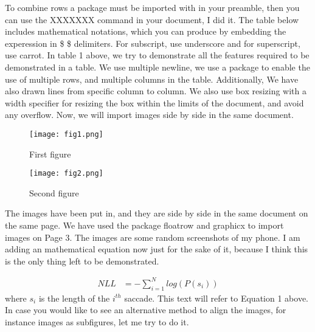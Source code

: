 \documentclass[14pt]{extarticle}
\begin{document}
To combine rows a package must  be  imported with in your preamble, then
you can use the\hspace{0.25cm} XXXXXXX  \hspace{0.3cm} command in your document,  I\hspace{0.3cm}  did\hspace{0.5cm}  it.  \hspace{0.3cm}The \hspace{0.25cm}
table below includes  mathematical  notations, \hspace{0.20cm}which \hspace{0.5cm}you \hspace{0.5cm}can produce by
embedding  the  experession in \hspace{0.25cm}\$ \$\hspace{0.25cm} delimiters. \hspace{0.2cm}For subscript, use underscore
and for superscript, use carrot.
\vskip 1cm
{\Large{In table 1 above, we try to demonstrate all the features required to be demonstrated in a table. We use multiple newline, we use a package to enable the use of multiple rows, and multiple columns in the table. Additionally, We have also drawn lines from specific column to column. We also use box resizing with a width specifier for resizing the box within the limits of the document, and avoid any overflow.}}
\vskip 1cm
Now, we will import images side by side in the same document.
\begin{figure}[!tbp]
  \centering
  \begin{minipage}[b]{0.49\textwidth}
    \texttt{[image: fig1.png]}
    \caption{First figure}
  \end{minipage}
  \hfill
  \begin{minipage}[b]{0.49
  \textwidth}
    \texttt{[image: fig2.png]}
    \caption{Second figure}
  \end{minipage}
\end{figure}

\vskip 4cm
The images have been put in, and they are side by side in the same document
on the same page. We have used the package floatrow and graphicx to
import images on Page 3. The images are some random screenshots of my
phone. I am adding an mathematical equation now just for the sake of it,
because I think this is the only thing left to be demonstrated.

\begin{align}
  NLL &= -\sum_{i=1}^{N} log(P(s_i))  
\end{align} 
where $s_i$ is the length of the $i^{th}$ saccade.
\vskip 2mm
This text will refer to Equation 1 above. In case you would like to see an
alternative method to align the images, for instance images as subfigures, let
me try to do it.
\end{document}
